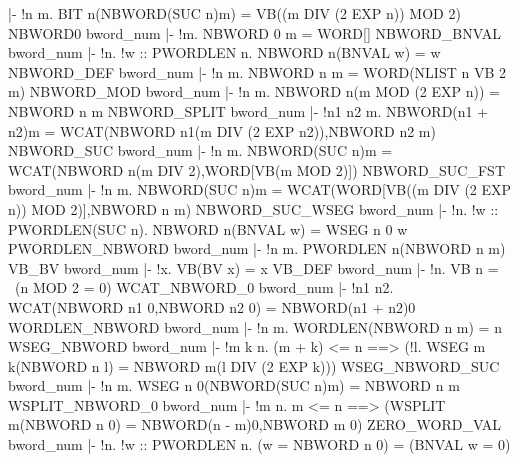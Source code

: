 |- !n m. BIT n(NBWORD(SUC n)m) = VB((m DIV (2 EXP n)) MOD 2)
\ENDTHEOREM
\THEOREM NBWORD0 bword\_num
|- !m. NBWORD 0 m = WORD[]
\ENDTHEOREM
\THEOREM NBWORD\_BNVAL bword\_num
|- !n. !w :: PWORDLEN n. NBWORD n(BNVAL w) = w
\ENDTHEOREM
\THEOREM NBWORD\_DEF bword\_num
|- !n m. NBWORD n m = WORD(NLIST n VB 2 m)
\ENDTHEOREM
\THEOREM NBWORD\_MOD bword\_num
|- !n m. NBWORD n(m MOD (2 EXP n)) = NBWORD n m
\ENDTHEOREM
\THEOREM NBWORD\_SPLIT bword\_num
|- !n1 n2 m.
    NBWORD(n1 + n2)m = WCAT(NBWORD n1(m DIV (2 EXP n2)),NBWORD n2 m)
\ENDTHEOREM
\THEOREM NBWORD\_SUC bword\_num
|- !n m. NBWORD(SUC n)m = WCAT(NBWORD n(m DIV 2),WORD[VB(m MOD 2)])
\ENDTHEOREM
\THEOREM NBWORD\_SUC\_FST bword\_num
|- !n m.
    NBWORD(SUC n)m = WCAT(WORD[VB((m DIV (2 EXP n)) MOD 2)],NBWORD n m)
\ENDTHEOREM
\THEOREM NBWORD\_SUC\_WSEG bword\_num
|- !n. !w :: PWORDLEN(SUC n). NBWORD n(BNVAL w) = WSEG n 0 w
\ENDTHEOREM
\THEOREM PWORDLEN\_NBWORD bword\_num
|- !n m. PWORDLEN n(NBWORD n m)
\ENDTHEOREM
\THEOREM VB\_BV bword\_num
|- !x. VB(BV x) = x
\ENDTHEOREM
\THEOREM VB\_DEF bword\_num
|- !n. VB n = ~(n MOD 2 = 0)
\ENDTHEOREM
\THEOREM WCAT\_NBWORD\_0 bword\_num
|- !n1 n2. WCAT(NBWORD n1 0,NBWORD n2 0) = NBWORD(n1 + n2)0
\ENDTHEOREM
\THEOREM WORDLEN\_NBWORD bword\_num
|- !n m. WORDLEN(NBWORD n m) = n
\ENDTHEOREM
\THEOREM WSEG\_NBWORD bword\_num
|- !m k n.
    (m + k) <= n ==>
    (!l. WSEG m k(NBWORD n l) = NBWORD m(l DIV (2 EXP k)))
\ENDTHEOREM
\THEOREM WSEG\_NBWORD\_SUC bword\_num
|- !n m. WSEG n 0(NBWORD(SUC n)m) = NBWORD n m
\ENDTHEOREM
\THEOREM WSPLIT\_NBWORD\_0 bword\_num
|- !m n. m <= n ==> (WSPLIT m(NBWORD n 0) = NBWORD(n - m)0,NBWORD m 0)
\ENDTHEOREM
\THEOREM ZERO\_WORD\_VAL bword\_num
|- !n. !w :: PWORDLEN n. (w = NBWORD n 0) = (BNVAL w = 0)
\ENDTHEOREM
